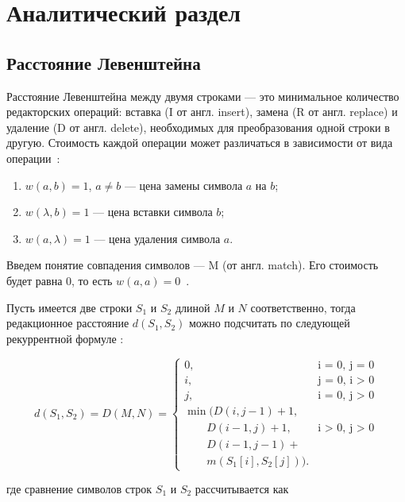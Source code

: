 \chapter{Аналитический раздел}


\section{Расстояние Левенштейна}

Расстояние Левенштейна между двумя строками --- это минимальное количество редакторских операций: вставка (I от англ. insert), замена (R от англ. replace) и удаление (D от англ. delete), необходимых для преобразования одной строки в другую.
Стоимость каждой операции может различаться в зависимости от вида операции~\cite{levenshtein}:

\begin{enumerate}
	\item $w(a, b) = 1$, $a \neq b$ --- цена замены символа $a$ на $b$;
	\item $w(\lambda, b) = 1$ --- цена вставки символа $b$;
	\item $w(a, \lambda) = 1$ --- цена удаления символа $a$.
\end{enumerate}

Введем понятие совпадения символов --- M (от англ. match). 
Его стоимость будет равна 0, то есть $w(a, a) = 0$~\cite{analysis-lev-damlev}.

Пусть  имеется две строки $S_{1}$ и $S_{2}$ длиной $M$ и $N$ соответственно, тогда редакционное расстояние $d(S_{1}, S_{2})$ можно подсчитать по следующей рекуррентной формуле \cite{prog-impl-lev}:

\begin{equation}
	\label{eq:L}
	 d(S_{1}, S_{2}) = D(M, N) = \begin{cases}
		
		0, &\text{i = 0, j = 0}\\
		i, &\text{j = 0, i > 0}\\
		j, &\text{i = 0, j > 0}\\
		\min ( 
		 D(i, j-1) + 1,\\
		\qquad D(i-1, j) + 1, &\text{i > 0, j > 0}\\
		\qquad D(i-1, j-1) + \\ 
		\qquad m(S_{1}[i], S_{2}[j]) ).
	\end{cases}
\end{equation}

где сравнение символов строк $S_1$ и $S_2$ рассчитывается как

